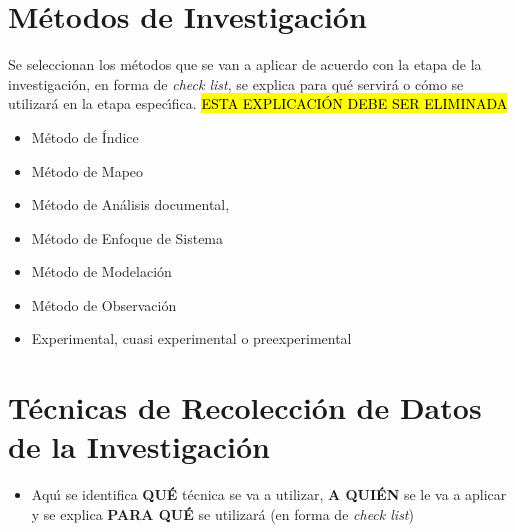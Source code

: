 \section{M\'{e}todos de Investigaci\'{o}n}
\label{cap2:sec:metodos_de_investigacion}

Se seleccionan los m\'{e}todos que se van a aplicar de acuerdo con la etapa de la investigaci\'{o}n, 
en forma de \textit{check list}, se explica para qu\'{e} servir\'{a} o c\'{o}mo se utilizar\'{a} en la etapa 
espec\'{\i}fica. \hl{ESTA EXPLICACI\'{O}N DEBE SER ELIMINADA} 

\begin{itemize}
    \item M\'{e}todo de \'{I}ndice  

    \item M\'{e}todo de Mapeo 

    \item M\'{e}todo de An\'{a}lisis documental,  

    \item M\'{e}todo de Enfoque de Sistema 

    \item M\'{e}todo de Modelaci\'{o}n 

    \item M\'{e}todo de Observaci\'{o}n 

    \item Experimental, cuasi experimental o preexperimental 
\end{itemize}

\section{T\'ecnicas de Recolecci\'on de Datos de la Investigaci\'on }
\label{cap2:sec:tecnicas_de_recoleccion_de_datos_de_la_investigacion }

\begin{itemize}
    \item Aqu\'{\i} se identifica \textbf{QU\'{E}} t\'{e}cnica se va a utilizar, \textbf{A QUI\'{E}N} se le 
          va a aplicar y se explica \textbf{PARA QU\'{E}} se utilizar\'{a} (en forma de \textit{check list})  
\end{itemize}


